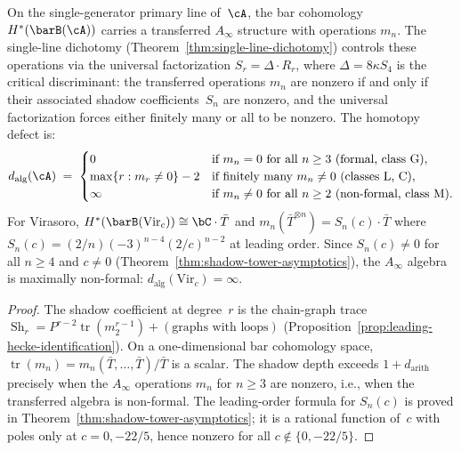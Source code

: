 \begin{theorem}
\label{thm:ainfty-formality-depth}
\label{thm:shadow-sullivan}
\ClaimStatusConditional
On the single-generator primary line of~$\cA$, the bar cohomology
$H^*(\barB(\cA))$ carries a transferred $A_\infty$ structure with
operations $m_n$. The single-line dichotomy
\textup{(}Theorem~\textup{\ref{thm:single-line-dichotomy})}
controls these operations via the universal factorization
$S_r = \Delta \cdot R_r$, where $\Delta = 8\kappa S_4$ is
the critical discriminant: the transferred operations
$m_n$ are nonzero if and only if their associated shadow
coefficients~$S_n$ are nonzero, and the universal
factorization forces either finitely many or all to be
nonzero. The homotopy defect is:
\[
 d_{\mathrm{alg}}(\cA) \;=\;
 \begin{cases}
 0 & \text{if $m_n = 0$ for all $n \ge 3$
 \textup{(}formal, class~G\textup{)}},\\
 \max\{r : m_r \ne 0\} - 2
 & \text{if finitely many $m_n \ne 0$
 \textup{(}classes L, C\textup{)}},\\
 \infty & \text{if $m_n \ne 0$ for all $n \ge 2$
 \textup{(}non-formal, class~M\textup{)}}.
 \end{cases}
\]
For Virasoro, $H^*(\barB(\mathrm{Vir}_c)) \cong \bC\cdot\bar{T}$
and $m_n(\bar{T}^{\otimes n}) = S_n(c)\cdot\bar{T}$ where
$S_n(c) = (2/n)(-3)^{n-4}(2/c)^{n-2}$ at leading order.
Since $S_n(c) \ne 0$ for all $n \ge 4$ and $c \ne 0$
\textup{(}Theorem~\textup{\ref{thm:shadow-tower-asymptotics}}\textup{)},
the $A_\infty$ algebra is maximally non-formal:
$d_{\mathrm{alg}}(\mathrm{Vir}_c) = \infty$.
\end{theorem}

\begin{proof}
The shadow coefficient at degree~$r$ is the chain-graph trace
$\operatorname{Sh}_r = P^{r-2}\operatorname{tr}(m_2^{r-1})
+ (\text{graphs with loops})$
(Proposition~\ref{prop:leading-hecke-identification}).
On a one-dimensional bar cohomology space,
$\operatorname{tr}(m_n) = m_n(\bar{T},\dotsc,\bar{T})/\bar{T}$
is a scalar. The shadow depth exceeds $1+d_{\mathrm{arith}}$
precisely when the $A_\infty$ operations $m_n$ for $n \ge 3$
are nonzero, i.e., when the transferred algebra is non-formal.
The leading-order formula for $S_n(c)$ is proved in
Theorem~\ref{thm:shadow-tower-asymptotics}; it is a rational
function of~$c$ with poles only at $c = 0, -22/5$, hence
nonzero for all $c \notin \{0, -22/5\}$.
\end{proof}

